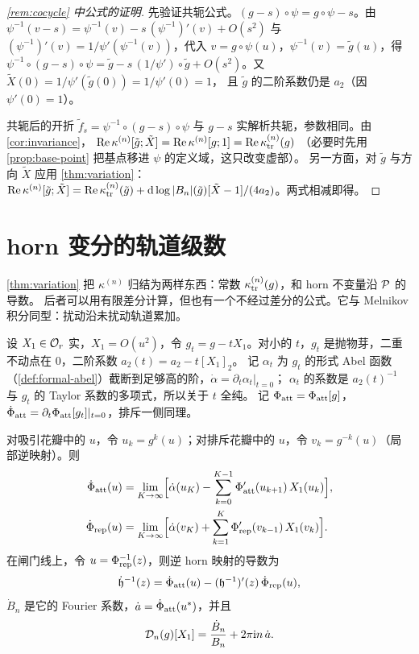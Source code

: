 \begin{proof}[\cref{rem:cocycle} 中公式的证明]
先验证共轭公式。$(g-s)\circ\psi=g\circ\psi-s$。由 $\psi^{-1}(v-s)=\psi^{-1}(v)-s\,(\psi^{-1})'(v)+O(s^2)$ 与
$(\psi^{-1})'(v)=1/\psi'(\psi^{-1}(v))$，代入 $v=g\circ\psi(u)$，$\psi^{-1}(v)=\tilde g(u)$，得
$\psi^{-1}\circ(g-s)\circ\psi=\tilde g-s\,(1/\psi')\circ\tilde g+O(s^2)$。又 $\tilde X(0)=1/\psi'(\tilde g(0))=1/\psi'(0)=1$，
且 $\tilde g$ 的二阶系数仍是 $a_2$（因 $\psi'(0)=1$）。

共轭后的开折 $\tilde f_s=\psi^{-1}\circ(g-s)\circ\psi$ 与 $g-s$ 实解析共轭，参数相同。由 \cref{cor:invariance}，
$\operatorname{Re}\kappa^{(n)}[\tilde g;\tilde X]=\operatorname{Re}\kappa^{(n)}[g;1]=\operatorname{Re}\kappa_{\mathrm{tr}}^{(n)}(g)$
（必要时先用 \cref{prop:base-point} 把基点移进 $\psi$ 的定义域，这只改变虚部）。
另一方面，对 $\tilde g$ 与方向 $\tilde X$ 应用 \cref{thm:variation}：
$\operatorname{Re}\kappa^{(n)}[\tilde g;\tilde X]=\operatorname{Re}\kappa_{\mathrm{tr}}^{(n)}(\tilde g)+\mathrm{d}\log|B_n|(\tilde g)[\tilde X-1]/(4a_2)$。两式相减即得。
\end{proof}

\section{horn 变分的轨道级数}\label{ch9:sec:melnikov}

\cref{thm:variation} 把 $\kappa^{(n)}$ 归结为两样东西：常数 $\kappa_{\mathrm{tr}}^{(n)}(g)$，和 horn 不变量沿 $\mathcal P$ 的导数。
后者可以用有限差分计算，但也有一个不经过差分的公式。它与 Melnikov 积分同型：扰动沿未扰动轨道累加。

设 $X_1\in\mathcal O_r$ 实，$X_1=O(u^2)$，令 $g_t=g-tX_1$。对小的 $t$，$g_t$ 是抛物芽，二重不动点在 $0$，二阶系数 $a_2(t)=a_2-t[X_1]_2$。
记 $\alpha_t$ 为 $g_t$ 的形式 Abel 函数（\cref{def:formal-abel}）截断到足够高的阶，$\dot\alpha=\partial_t\alpha_t|_{t=0}$；
$\alpha_t$ 的系数是 $a_2(t)^{-1}$ 与 $g_t$ 的 Taylor 系数的多项式，所以关于 $t$ 全纯。
记 $\Phi_{\mathrm{att}}=\Phi_{\mathrm{att}}[g]$，$\dot\Phi_{\mathrm{att}}=\partial_t\Phi_{\mathrm{att}}[g_t]|_{t=0}$，排斥一侧同理。

\begin{proposition}[轨道级数]\label{ch9:prop:melnikov}
对吸引花瓣中的 $u$，令 $u_k=g^k(u)$；对排斥花瓣中的 $u$，令 $v_k=g^{-k}(u)$（局部逆映射）。则
\begin{align}
 \dot\Phi_{\mathrm{att}}(u)&=\lim_{K\to\infty}\Bigl[\dot\alpha(u_K)-\sum_{k=0}^{K-1}\Phi_{\mathrm{att}}'(u_{k+1})\,X_1(u_k)\Bigr],\label{ch9:eq:mel-att}\\
 \dot\Phi_{\mathrm{rep}}(u)&=\lim_{K\to\infty}\Bigl[\dot\alpha(v_K)+\sum_{k=1}^{K}\Phi_{\mathrm{rep}}'(v_{k-1})\,X_1(v_k)\Bigr].\label{ch9:eq:mel-rep}
\end{align}
在闸门线上，令 $u=\Phi_{\mathrm{rep}}^{-1}(z)$，则逆 horn 映射的导数为
\[
 \dot{\mathfrak h}{}^{-1}(z)=\dot\Phi_{\mathrm{att}}(u)-(\mathfrak h^{-1})'(z)\,\dot\Phi_{\mathrm{rep}}(u),
\]
$\dot B_n$ 是它的 Fourier 系数，$\dot a=\dot\Phi_{\mathrm{att}}(u^{*})$，并且
\[
 \mathcal D_n(g)[X_1]=\frac{\dot B_n}{B_n}+2\pi\mathrm{i} n\,\dot a .
\]
\end{proposition}

